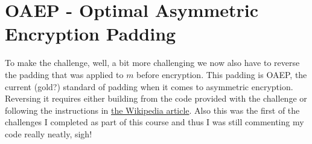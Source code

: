 \documentclass{article}
\begin{document}
\section{OAEP - Optimal Asymmetric Encryption Padding}

To make the challenge, well, a bit more challenging we now also have to reverse the padding that was applied to $m$ before encryption. This padding is OAEP, the current (gold?) standard of padding when it comes to asymmetric encryption. Reversing it requires either building from the code provided with the challenge or following the instructions in \href{https://en.wikipedia.org/wiki/Optimal_asymmetric_encryption_padding}{the Wikipedia article}. Also this was the first of the challenges I completed as part of this course and thus I was still commenting my code really neatly, sigh!
\end{document}
